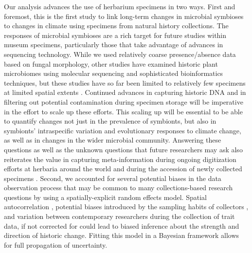 \documentclass[11pt]{article}
\begin{document}
Our analysis advances the use of herbarium specimens in two ways. 
First and foremost, this is the first study to link long-term changes in microbial symbioses to changes in climate using specimens from natural history collections.
The responses of microbial symbioses are a rich target for future studies within museum specimens, particularly those that take advantage of advances in sequencing technology.
While we used relatively coarse presence/absence data based on fungal morphology, other studies have examined historic plant microbiomes using molecular sequencing and sophisticated bioinformatics techniques, but these studies have so far been limited to relatively few specimens at limited spatial extents \cite{yoshida2015computational, heberling2019utilizing, bieker2020metagenomic, gross2021hidden, bradshaw2021global}. 
Continued advances in capturing historic DNA and in filtering out potential contamination during specimen storage \citep{daru2019novel, bakker2020herbarium, raxworthy2021mining} will be imperative in the effort to scale up these efforts. 
This scaling up will be essential to be able to quantify changes not just in the prevalence of symbionts, but also in symbionts' intraspecific variation and evolutionary responses to climate change, as well as  in changes in the wider microbial community. 
Answering these questions as well as the unknown questions that future researchers may ask also reiterates the value in capturing meta-information during ongoing digitization efforts at herbaria around the world and during the accession of newly collected specimens \citep{lendemer2020extended}.
Second, we accounted for several potential biases in the data observation process that may be common to many collections-based research questions by using a spatially-explicit random effects model. 
Spatial autocorrelation \cite{willems2022forest}, potential biases introduced by the sampling habits of collectors \citep{daru2018widespread}, and variation between contemporary researchers during the collection of trait data, if not corrected for could lead to biased inference about the strength and direction of historic change.
Fitting this model in a Bayesian framework allows for full propagation of uncertainty.
\end{document}
